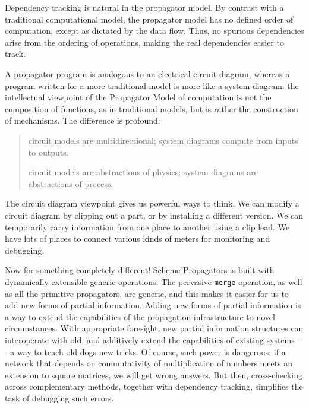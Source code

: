 \documentclass[12pt,letterpaper,english]{article}
\begin{document}
Dependency tracking is natural in the propagator model.  By contrast
with a traditional computational model, the propagator model has no
defined order of computation, except as dictated by the data flow.
Thus, no spurious dependencies arise from the ordering of operations,
making the real dependencies easier to track.

A propagator program is analogous to an electrical circuit diagram,
whereas a program written for a more traditional model is more like a
system diagram: the intellectual viewpoint of the Propagator Model of
computation is not the composition of functions, as in traditional
models, but is rather the construction of mechanisms.  The difference
is profound:
\begin{quote}
\begin{list}{.}
{
\setlength{\rightmargin}{\leftmargin}
}
\item {} 
circuit models are multidirectional; system diagrams compute
from inputs to outputs.

\item {} 
circuit models are abstractions of physics; system diagrams
are abstractions of process.

\end{list}
\end{quote}

The circuit diagram viewpoint gives us powerful ways to think.  We can
modify a circuit diagram by clipping out a part, or by installing a
different version.  We can temporarily carry information from one
place to another using a clip lead.  We have lots of places to connect
various kinds of meters for monitoring and debugging.

Now for something completely different!  Scheme-Propagators is built
with dynamically-extensible generic operations.  The pervasive
\texttt{merge} operation, as well as all the primitive propagators, are
generic, and this makes it easier for us to add new forms of partial
information.  Adding new forms of partial information is a way to
extend the capabilities of the propagation infrastructure to novel
circumstances.  With appropriate foresight, new partial information
structures can interoperate with old, and additively extend the
capabilities of existing systems -{}-{}- a way to teach old dogs new
tricks.  Of course, such power is dangerous: if a network that depends
on commutativity of multiplication of numbers meets an extension to
square matrices, we will get wrong answers.  But then, cross-checking
across complementary methods, together with dependency tracking,
simplifies the task of debugging such errors.



\end{document}
